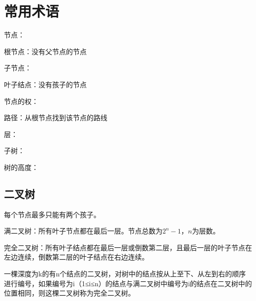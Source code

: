 \documentclass[a4paper]{report}
\begin{document}
\section{常用术语}
节点：

根节点：没有父节点的节点

子节点：

叶子结点：没有孩子的节点

节点的权：

路径：从根节点找到该节点的路线

层：

子树：

树的高度：
\subsection{二叉树}
每个节点最多只能有两个孩子。

满二叉树：所有叶子节点都在最后一层。节点总数为$2^n - 1$，$n$为层数。

完全二叉树：所有叶子结点都在最后一层或倒数第二层，且最后一层的叶子节点在左边连续，倒数第二层的叶子结点在右边连续。

一棵深度为k的有n个结点的二叉树，对树中的结点按从上至下、从左到右的顺序进行编号，如果编号为i（1≤i≤n）的结点与满二叉树中编号为i的结点在二叉树中的位置相同，则这棵二叉树称为完全二叉树。
\end{document}
